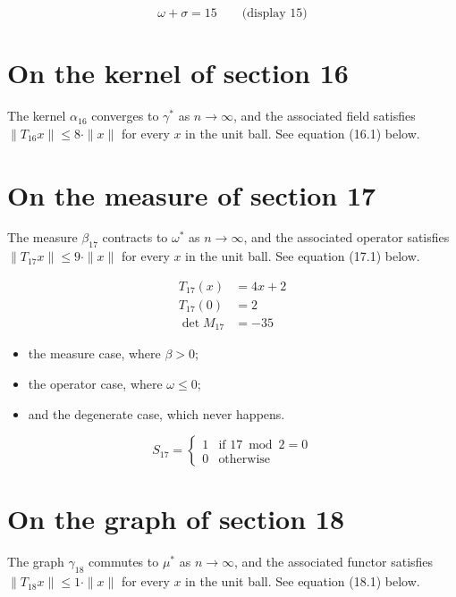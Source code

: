 \documentclass{article}
\begin{document}
$$
\omega + \sigma = 15 \qquad \text{(display 15)}
$$

\section{On the kernel of section 16}
The kernel $\alpha_{16}$ converges to $\gamma^{*}$ as $n \to \infty$,
and the associated field satisfies $\|T_{16} x\| \leq 8 \cdot \|x\|$
for every $x$ in the unit ball. See equation (16.1) below.

\section{On the measure of section 17}
The measure $\beta_{17}$ contracts to $\omega^{*}$ as $n \to \infty$,
and the associated operator satisfies $\|T_{17} x\| \leq 9 \cdot \|x\|$
for every $x$ in the unit ball. See equation (17.1) below.

\begin{align}
T_{17}(x) &= 4 x + 2 \\
T_{17}(0) &= 2 \\
\det M_{17} &= -35
\end{align}

\begin{itemize}
  \item the measure case, where $\beta > 0$;
  \item the operator case, where $\omega \leq 0$;
  \item and the degenerate case, which never happens.
\end{itemize}

\begin{equation}
S_{17} = \begin{cases} 1 & \text{if } 17 \bmod 2 = 0 \\ 0 & \text{otherwise} \end{cases}
\end{equation}

\section{On the graph of section 18}
The graph $\gamma_{18}$ commutes to $\mu^{*}$ as $n \to \infty$,
and the associated functor satisfies $\|T_{18} x\| \leq 1 \cdot \|x\|$
for every $x$ in the unit ball. See equation (18.1) below.
\end{document}
